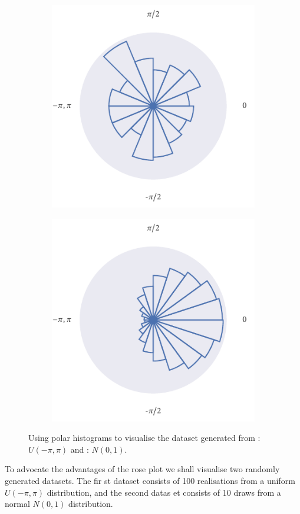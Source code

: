 \begin{figure}
	\begin{subfigure}[b]{0.45\textwidth}
		\includegraphics{unif_angle_rose.pdf}
		\caption{}
		\label{subfig:unif_angle_rose}
	\end{subfigure}%
	\hspace{0.05\textwidth}%
	\begin{subfigure}[b]{0.45\textwidth}
		\includegraphics{norm_angle_rose.pdf}
		\caption{}
		\label{subfig:norm_angle_rose}
	\end{subfigure}
	\caption{Using polar histograms to visualise the dataset generated from : $U(-\pi,\pi)$ and : $N(0, 1)$.}
	\label{fig:angle_rose}
\end{figure}
To advocate the advantages of the rose plot we shall visualise two randomly generated datasets. The fir
st dataset consists of 100 realisations from a uniform $U(-\pi,\pi)$ distribution, and the second datas
et consists of 10 draws from a normal $N(0, 1)$ distribution.

